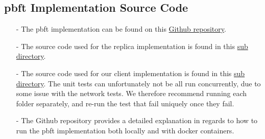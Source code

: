 \documentclass[12pt, a4paper]{report}
\numberwithin{figure}{section}
\numberwithin{table}{section}
\begin{document}
\newpage
\begin{appendices}
	\chapter{\ac{pbft} Implementation Source Code}
	\begin{itemize}
		\item[-] The \ac{pbft} implementation can be found on this \href{https://github.com/Lupu2/PBFT-Master}{Github repository}.
		\item[-] The source code used for the replica implementation is found in this \href{https://github.com/Lupu2/PBFT-Master/tree/main/PBFT}{sub directory}.
		\item[-] The source code used for our client implementation is found in this \href{https://github.com/Lupu2/PBFT-Master/tree/main/PBFTClient}{sub directory}. The unit tests can unfortunately not be all run concurrently, due to some issue with the network tests. We therefore recommend running each folder separately, and re-run the test that fail uniquely once they fail. 
		\item[-] The Github repository provides a detailed explanation in regards to how to run the \ac{pbft} implementation both locally and with docker containers. 
	\end{itemize} 
\end{appendices}
\printbibliography[heading=bibintoc]
\end{document}

